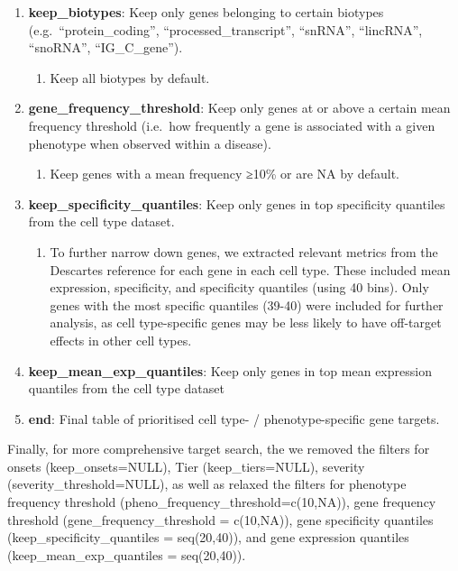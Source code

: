 \documentclass[
sn-nature
]{sn-jnl}
\providecommand{\tightlist}{%
  \setlength{\itemsep}{0pt}\setlength{\parskip}{0pt}}\usepackage{longtable,booktabs,array}
\begin{document}
\begin{enumerate}
  \begin{enumerate}
  \def\labelenumii{\arabic{enumii}.}
  \tightlist
  \item
    Due to limitations in the length of the gene that can be carried by
    the rAAV vector, genes with a length of \textgreater4.3kb were
    excluded.
  \end{enumerate}
\item
  \textbf{keep\_biotypes}: Keep only genes belonging to certain biotypes
  (e.g.~``protein\_coding'', ``processed\_transcript'', ``snRNA'',
  ``lincRNA'', ``snoRNA'', ``IG\_C\_gene'').

  \begin{enumerate}
  \def\labelenumii{\arabic{enumii}.}
  \tightlist
  \item
    Keep all biotypes by default.
  \end{enumerate}
\item
  \textbf{gene\_frequency\_threshold}: Keep only genes at or above a
  certain mean frequency threshold (i.e.~how frequently a gene is
  associated with a given phenotype when observed within a disease).

  \begin{enumerate}
  \def\labelenumii{\arabic{enumii}.}
  \tightlist
  \item
    Keep genes with a mean frequency ≥10\% or are NA by default.
  \end{enumerate}
\item
  \textbf{keep\_specificity\_quantiles}: Keep only genes in top
  specificity quantiles from the cell type dataset.

  \begin{enumerate}
  \def\labelenumii{\arabic{enumii}.}
  \tightlist
  \item
    To further narrow down genes, we extracted relevant metrics from the
    Descartes reference for each gene in each cell type. These included
    mean expression, specificity, and specificity quantiles (using 40
    bins). Only genes with the most specific quantiles (39-40) were
    included for further analysis, as cell type-specific genes may be
    less likely to have off-target effects in other cell types.
  \end{enumerate}
\item
  \textbf{keep\_mean\_exp\_quantiles}: Keep only genes in top mean
  expression quantiles from the cell type dataset
\item
  \textbf{end}: Final table of prioritised cell type- /
  phenotype-specific gene targets.
\end{enumerate}

Finally, for more comprehensive target search, the we removed the
filters for onsets (keep\_onsets=NULL), Tier (keep\_tiers=NULL),
severity (severity\_threshold=NULL), as well as relaxed the filters for
phenotype frequency threshold (pheno\_frequency\_threshold=c(10,NA)),
gene frequency threshold (gene\_frequency\_threshold = c(10,NA)), gene
specificity quantiles (keep\_specificity\_quantiles = seq(20,40)), and
gene expression quantiles (keep\_mean\_exp\_quantiles = seq(20,40)).
\end{document}
